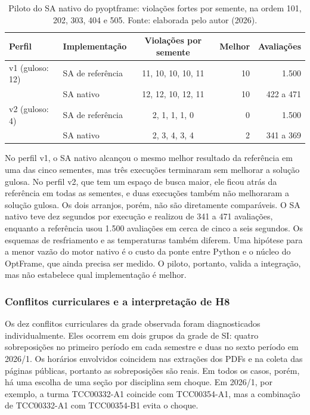 \begin{table}[htbp]
  \centering
  \caption{Piloto do SA nativo do pyoptframe: violações fortes por semente, na ordem 101, 202, 303, 404 e 505. Fonte: elaborada pelo autor (2026).}
  \label{tab:piloto}
  \small
  \begin{tabular}{llcrr}
    \toprule
    \textbf{Perfil} & \textbf{Implementação} & \textbf{Violações por semente} & \textbf{Melhor} & \textbf{Avaliações} \\
    \midrule
    v1 (guloso: 12) & SA de referência & 11, 10, 10, 10, 11 & 10 & 1.500 \\
                    & SA nativo        & 12, 12, 10, 12, 11 & 10 & 422 a 471 \\
    \midrule
    v2 (guloso: 4)  & SA de referência & 2, 1, 1, 1, 0 & 0 & 1.500 \\
                    & SA nativo        & 2, 3, 4, 3, 4 & 2 & 341 a 369 \\
    \bottomrule
  \end{tabular}
\end{table}

No perfil v1, o SA nativo alcançou o mesmo melhor resultado da referência em uma das cinco sementes, mas três execuções terminaram sem melhorar a solução gulosa. No perfil v2, que tem um espaço de busca maior, ele ficou atrás da referência em todas as sementes, e duas execuções também não melhoraram a solução gulosa. Os dois arranjos, porém, não são diretamente comparáveis. O SA nativo teve dez segundos por execução e realizou de 341 a 471 avaliações, enquanto a referência usou 1.500 avaliações em cerca de cinco a seis segundos. Os esquemas de resfriamento e as temperaturas também diferem. Uma hipótese para a menor vazão do motor nativo é o custo da ponte entre Python e o núcleo do OptFrame, que ainda precisa ser medido. O piloto, portanto, valida a integração, mas não estabelece qual implementação é melhor.

\subsubsection{Conflitos curriculares e a interpretação de H8}
\label{subsubsec:h8}

Os dez conflitos curriculares da grade observada foram diagnosticados individualmente. Eles ocorrem em dois grupos da grade de SI: quatro sobreposições no primeiro período em cada semestre e duas no sexto período em 2026/1. Os horários envolvidos coincidem nas extrações dos PDFs e na coleta das páginas públicas, portanto as sobreposições são reais. Em todos os casos, porém, há uma escolha de uma seção por disciplina sem choque. Em 2026/1, por exemplo, a turma TCC00332-A1 coincide com TCC00354-A1, mas a combinação de TCC00332-A1 com TCC00354-B1 evita o choque.

